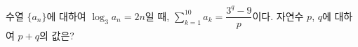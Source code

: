 수열 $\{a_n\}$에 대하여 $\log_3 a_n=2n$일 때, $\displaystyle\sum_{k=1}^{10}a_k=\dfrac{3^q-9}{p}$이다. 자연수 $p$, $q$에 대하여 $p+q$의 값은?
